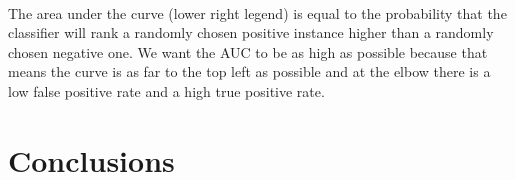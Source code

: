 \documentclass[11pt]{article}
\begin{document}
    \begin{center}
    \end{center}
    { \hspace*{\fill} \\}
    
    The area under the curve (lower right legend) is equal to the
probability that the classifier will rank a randomly chosen positive
instance higher than a randomly chosen negative one. We want the AUC to
be as high as possible because that means the curve is as far to the top
left as possible and at the elbow there is a low false positive rate and
a high true positive rate.

    \section{Conclusions}\label{conclusions}


    
    
    
    
\end{document}
